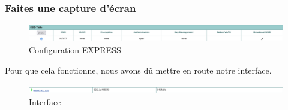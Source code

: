 \documentclass[12pt, a4paper]{article}
\begin{document}
        \subsubsection{Faites une capture d'écran}
        \begin{figure}[H]
            \centering
            \includegraphics[width=1\textwidth]{img/config-express.png}
            \caption{Configuration EXPRESS}
            \label{fig:exp}
        \end{figure}
        Pour que cela fonctionne, nous avons dû mettre en route notre interface.
        \begin{figure}[H]
            \centering
            \includegraphics[width=1\textwidth]{img/int.png}
            \caption{Interface}
            \label{fig:int}
        \end{figure}
\end{document}

